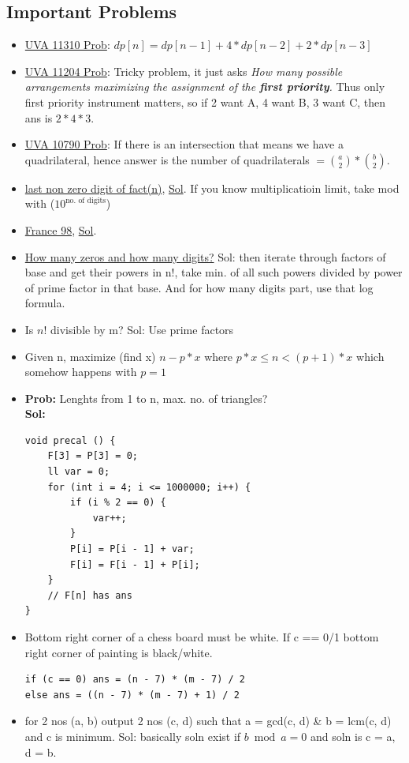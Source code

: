 \documentclass[8pt, a4paper, oneside, twocolumn]{extarticle}
\begin{document}
\subsection{Important Problems}
\begin{itemize}
	\item \href {https://uva.onlinejudge.org/external/113/11310.pdf}{UVA 11310 Prob}: $dp[n] = dp[n - 1] + 4 * dp[n - 2] + 2 * dp[n - 3]$
	\item \href {https://uva.onlinejudge.org/external/112/11204.pdf}{UVA 11204 Prob}: Tricky problem, it just asks \textit{How many possible arrangements maximizing the assignment of the \textbf{first priority}.} Thus only first priority instrument matters, so if 2 want A, 4 want B, 3 want C, then ans is $2 * 4 * 3$.
    \item \href {https://uva.onlinejudge.org/external/107/10790.pdf}{UVA 10790 Prob}: If there is an intersection that means we have a quadrilateral, hence answer is the number of quadrilaterals $ = \binom{a}{2} * \binom{b}{2}$.
    \item \href {https://uva.onlinejudge.org/external/5/568.pdf}{last non zero digit of fact(n)}, \href {https://gist.github.com/sourabh2311/3e7d2c8c905cce7f04eb86400d4aac35}{Sol}. If you know multiplicatioin limit, take mod with ($10^{\text{no. of digits}}$)
    \item \href {https://uva.onlinejudge.org/external/5/542.pdf}{France 98}, \href {https://gist.github.com/sourabh2311/94629bd0303d3c4f918bda3bdaf8e711}{Sol}.
    \item \href {https://uva.onlinejudge.org/external/100/10061.pdf}{How many zeros and how many digits?} Sol: then iterate through factors of base and get their powers in n!, take min. of all such powers divided by power of prime factor in that base. And for how many digits part, use that log formula.
    \item Is $n!$ divisible by m? Sol: Use prime factors
    \item Given n, maximize (find x) $n - p*x$ where $p*x \leq n < (p + 1)*x$ which somehow happens with $p = 1$
    \item \textbf{Prob: }Lenghts from 1 to n, max. no. of triangles?
            \\\textbf{Sol: }\begin{verbatim}
void precal () {
    F[3] = P[3] = 0;
    ll var = 0;
    for (int i = 4; i <= 1000000; i++) {
        if (i % 2 == 0) {
            var++;
        }
        P[i] = P[i - 1] + var;
        F[i] = F[i - 1] + P[i];
    }
    // F[n] has ans
}
            \end{verbatim}
    \item Bottom right corner of a chess board must be white. If c == 0/1 bottom right corner of painting is black/white.
    \begin{verbatim}
if (c == 0) ans = (n - 7) * (m - 7) / 2
else ans = ((n - 7) * (m - 7) + 1) / 2
    \end{verbatim}
    \item for 2 nos (a, b) output 2 nos (c, d) such that a = gcd(c, d) \& b = lcm(c, d) and c is minimum. Sol: basically soln exist if $b \bmod a = 0$ and soln is c = a, d = b.
\end{itemize}
\end{document}
